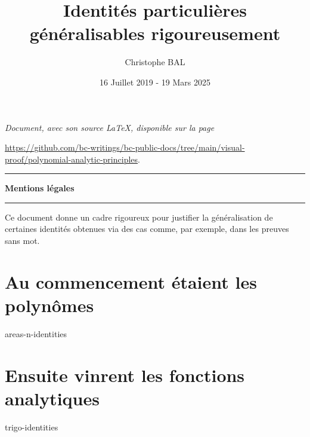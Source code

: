 \documentclass[12pt]{amsart}
\begin{document}
\title{Identités particulières généralisables rigoureusement}
\author{Christophe BAL}
\date{16 Juillet 2019 - 19 Mars 2025}

\maketitle

\begin{center}
	\itshape
	Document, avec son source \LaTeX, disponible sur la page

	\url{https://github.com/bc-writings/bc-public-docs/tree/main/visual-proof/polynomial-analytic-principles}.
\end{center}


\bigskip


\begin{center}
	\hrule\vspace{.3em}
	{
		\fontsize{1.35em}{1em}\selectfont
		\textbf{Mentions \og légales \fg}
	}

	\vspace{0.45em}
	\doclicenseThis
	\hrule
\end{center}


\bigskip


\setcounter{tocdepth}{1}
\tableofcontents



\newpage

\begin{meta-abstract*}
	Ce document donne un cadre rigoureux pour justifier la généralisation de certaines identités obtenues via des cas  comme, par exemple, dans les preuves sans mot. 
\end{meta-abstract*}


\section{Au commencement étaient les polynômes}

{areas-n-identities}



\newpage

\section{Ensuite vinrent les fonctions analytiques}

{trigo-identities}
\end{document}
